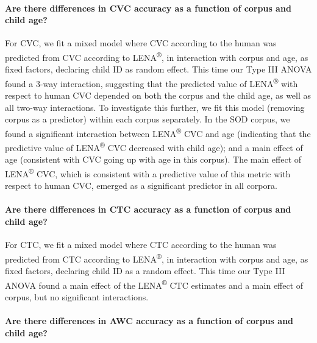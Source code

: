 \documentclass[english,table,man,floatsintext]{apa6}
\let\oldparagraph\paragraph
\renewcommand{\paragraph}[1]{\oldparagraph{#1}\mbox{}}
\begin{document}
\hypertarget{are-there-differences-in-cvc-accuracy-as-a-function-of-corpus-and-child-age}{%
\paragraph{Are there differences in CVC accuracy as a function of corpus and child age?}\label{are-there-differences-in-cvc-accuracy-as-a-function-of-corpus-and-child-age}}

For CVC, we fit a mixed model where CVC according to the human was predicted from CVC according to LENA\textsuperscript{®}, in interaction with corpus and age, as fixed factors, declaring child ID as random effect. This time our Type III ANOVA found a 3-way interaction, suggesting that the predicted value of LENA\textsuperscript{®} with respect to human CVC depended on both the corpus and the child age, as well as all two-way interactions. To investigate this further, we fit this model (removing corpus as a predictor) within each corpus separately. In the SOD corpus, we found a significant interaction between LENA\textsuperscript{®} CVC and age (indicating that the predictive value of LENA\textsuperscript{®} CVC decreased with child age); and a main effect of age (consistent with CVC going up with age in this corpus). The main effect of LENA\textsuperscript{®} CVC, which is consistent with a predictive value of this metric with respect to human CVC, emerged as a significant predictor in all corpora.

\hypertarget{are-there-differences-in-ctc-accuracy-as-a-function-of-corpus-and-child-age}{%
\paragraph{Are there differences in CTC accuracy as a function of corpus and child age?}\label{are-there-differences-in-ctc-accuracy-as-a-function-of-corpus-and-child-age}}

For CTC, we fit a mixed model where CTC according to the human was predicted from CTC according to LENA\textsuperscript{®}, in interaction with corpus and age, as fixed factors, declaring child ID as a random effect. This time our Type III ANOVA found a main effect of the LENA\textsuperscript{®} CTC estimates and a main effect of corpus, but no significant interactions.

\hypertarget{are-there-differences-in-awc-accuracy-as-a-function-of-corpus-and-child-age}{%
\paragraph{Are there differences in AWC accuracy as a function of corpus and child age?}\label{are-there-differences-in-awc-accuracy-as-a-function-of-corpus-and-child-age}}
\end{document}
